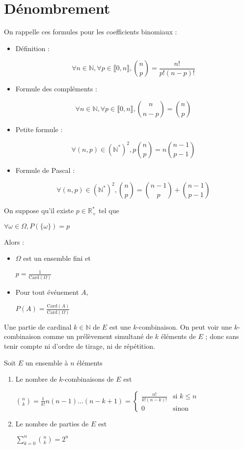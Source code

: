 \documentclass[a4paper,12pt]{book}
\newcommand{\Thr}[2]{\begin{tcolorbox}[sharp corners, colback=white,colframe=red!10!blue!30!green!75!, title=Théorème : #1]#2\end{tcolorbox}}
\def\R{\mathbb{R}}
\def\N{\mathbb{N}}
\begin{document}
\section{Dénombrement}
\Thr{}{On rappelle ces formules pour les coefficients binomiaux :\begin{itemize}
\item Définition :
\par $$\forall n\in\N, \forall p\in\llbracket 0,n\rrbracket, \binom{n}{p} = \dfrac{n!}{p!(n-p)!}$$
\item Formule des compléments :
\par $$\forall n\in\N, \forall p\in\llbracket 0, n\rrbracket, \binom{n}{n-p}=\binom{n}{p}$$
\item Petite formule :
\par $$\forall (n,p)\in(\N^*)^2, p\binom{n}{p} = n\binom{n-1}{p-1}$$
\item Formule de Pascal :
\par $$\forall (n,p)\in(\N^*)^2, \binom{n}{p} =\binom{n-1}{p}+\binom{n-1}{p-1}$$
\end{itemize}}
\Thr{}{On suppose qu'il existe $p\in\R_+^*$ tel que \par\begin{center}$\forall \omega\in \Omega, P(\{\omega\})=p$\end{center}
\par Alors :\begin{itemize}
\item $\Omega$ est un ensemble fini et \par\begin{center}$p=\frac{1}{\mathrm{Card}(\Omega)}$\end{center}
\item Pour tout événement $A$, \par\begin{center}$P(A)=\frac{\mathrm{Card}(A)}{\mathrm{Card}(\Omega)}$\end{center}
\end{itemize}}
Une partie de cardinal $k\in\N$ de $E$ est une $k$-combinaison. On peut voir une $k$-combinaison comme un prélèvement simultané de $k$ éléments de $E$ ; donc sans tenir compte ni d'ordre de tirage, ni de répétition.
\Thr{Nombre de parties}{Soit $E$ un ensemble à $n$ éléments\begin{enumerate}
\item Le nombre de $k$-combinaisons de $E$ est \par\begin{center} $\binom{n}{k}=\frac{1}{k!}n(n-1)...(n-k+1)=\left\{\begin{array}{rl} \frac{n!}{k!(n-k)!} & \text{si $k\leq n$} \\ 0 & \text{sinon}\end{array}\right.$\end{center}
\item Le nombre de parties de $E$ est \par\begin{center}$\sum\limits_{k=0}^n\binom{n}{k}=2^n$\end{center}
\end{enumerate}}
\end{document}
